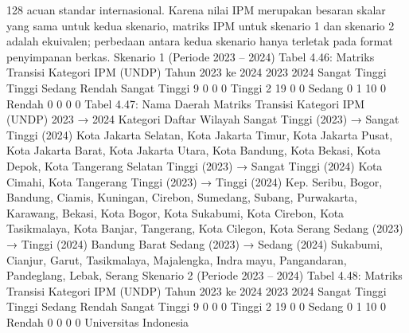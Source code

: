 128
acuan standar internasional. Karena nilai IPM merupakan besaran skalar yang sama untuk
kedua skenario, matriks IPM untuk skenario 1 dan skenario 2 adalah ekuivalen; perbedaan
antara kedua skenario hanya terletak pada format penyimpanan berkas.
Skenario 1 (Periode 2023 – 2024)
Tabel 4.46: Matriks Transisi Kategori IPM (UNDP) Tahun 2023 ke 2024
2023
2024 Sangat Tinggi Tinggi Sedang Rendah
Sangat Tinggi 9 0 0 0
Tinggi 2 19 0 0
Sedang 0 1 10 0
Rendah 0 0 0 0
Tabel 4.47: Nama Daerah Matriks Transisi Kategori IPM (UNDP) 2023 → 2024
Kategori Daftar Wilayah
Sangat Tinggi (2023)
→ Sangat Tinggi
(2024)
Kota Jakarta Selatan, Kota Jakarta Timur, Kota Jakarta Pusat,
Kota Jakarta Barat, Kota Jakarta Utara, Kota Bandung, Kota
Bekasi, Kota Depok, Kota Tangerang Selatan
Tinggi (2023) →
Sangat Tinggi (2024)
Kota Cimahi, Kota Tangerang
Tinggi (2023) →
Tinggi (2024)
Kep. Seribu, Bogor, Bandung, Ciamis, Kuningan, Cirebon,
Sumedang, Subang, Purwakarta, Karawang, Bekasi, Kota
Bogor, Kota Sukabumi, Kota Cirebon, Kota Tasikmalaya,
Kota Banjar, Tangerang, Kota Cilegon, Kota Serang
Sedang (2023) →
Tinggi (2024)
Bandung Barat
Sedang (2023) →
Sedang (2024)
Sukabumi, Cianjur, Garut, Tasikmalaya, Majalengka, Indramayu, Pangandaran, Pandeglang, Lebak, Serang
Skenario 2 (Periode 2023 – 2024)
Tabel 4.48: Matriks Transisi Kategori IPM (UNDP) Tahun 2023 ke 2024
2023
2024 Sangat Tinggi Tinggi Sedang Rendah
Sangat Tinggi 9 0 0 0
Tinggi 2 19 0 0
Sedang 0 1 10 0
Rendah 0 0 0 0
Universitas Indonesia

